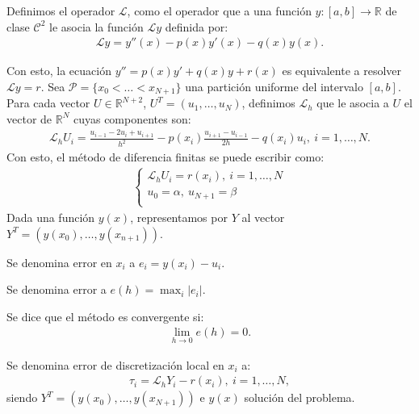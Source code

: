 \begin{defi}
Definimos el operador $\mathcal{L}$, como el operador que a una función $y: [a,b] \longrightarrow \mathbb{R}$ de clase $\mathscr{C}^2$ le asocia la función $\mathcal{L}y$ definida por:
\begin{align*}
    \mathcal{L}y = y''(x) - p(x)y'(x) - q(x)y(x).
\end{align*}
\end{defi}
\noindent Con esto, la ecuación $y'' =  p(x)y' + q(x)y + r(x)$ es equivalente a resolver $\mathcal{L}y = r$. Sea $\mathcal{P} = \{ x_0 < \ldots < x_{N+1}\}$ una partición uniforme del intervalo $[a,b]$. Para cada vector $U \in \mathbb{R}^{N+2}$, $U^T = (u_1,\ldots,u_N)$, definimos $\mathcal{L}_h$ que le asocia a $U$ el vector de $\mathbb{R}^N$ cuyas componentes son:
\begin{align*}
    \mathcal{L}_hU_i = \frac{u_{i-1} - 2u_i + u_{i+1}}{h^2} -p(x_i)\frac{u_{i+1} - u_{i-1}}{2h} - q(x_i)u_i, \ i = 1,\ldots,N.
\end{align*}
Con esto, el método de diferencia finitas se puede escribir como:
\begin{align*}
    \left\{ \begin{array}{lcc}
             \mathcal{L}_hU_i = r(x_i), \ i = 1,\ldots,N\\
             u_0 = \alpha, \ u_{N+1} = \beta\\
             \end{array}
   \right.
\end{align*}
Dada una función $y(x)$, representamos por $Y$ al vector $Y^T = (y(x_0), \ldots, y(x_{n+1}))$.

\begin{defi}
Se denomina error en $x_i$ a $e_i = y(x_i) - u_i$.
\end{defi}

\begin{defi}
Se denomina error a $e(h) = \max_{i} |e_i|$.
\end{defi}

\begin{defi}
Se dice que el método es convergente si:
\begin{align*}
    \lim_{h \to 0} e(h) = 0.
\end{align*}
\end{defi}

\begin{defi}
Se denomina error de discretización local en $x_i$ a:
\begin{align*}
    \tau_i = \mathcal{L}_hY_i - r(x_i), \ i = 1,\ldots,N,
\end{align*}
siendo $Y^T = (y(x_0), \ldots, y(x_{N+1}))$ e $y(x)$ solución del problema.
\end{defi}

